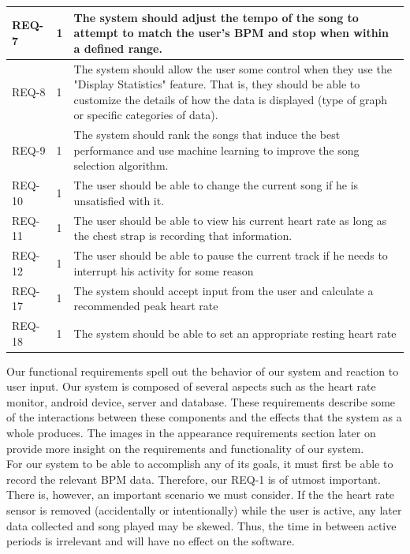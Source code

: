 \documentclass[letterpaper,english, 12pt]{scrreprt}
\begin{document}
\begin{center}
	\begin{tabular}{|C{2cm}|C{2cm}|C{8cm}|}
		\hline
			REQ-7 & 1 & The system should adjust the tempo of the song to attempt to match the user's BPM and stop when within a defined range. \\
		\hline
			REQ-8 & 1 & The system should allow the user some control when they use the "Display Statistics" feature. That is, they should be able to customize the details of how the data is displayed (type of graph or specific categories of data).\\
		\hline
			REQ-9 & 1 & The system should rank the songs that induce the best performance and use machine learning to improve the song selection algorithm. \\
		\hline
                        REQ-10 & 1 & The user should be able to change the current song if he is unsatisfied with it. \\
                \hline
                        REQ-11 & 1 & The user should be able to view his current heart rate as long as the chest strap is recording that information. \\
		\hline
			REQ-12 & 1 & The user should be able to pause the current track if he needs to interrupt his activity for some reason \\
		\hline
			REQ-17 & 1 & The system should accept input from the user and calculate a recommended peak heart rate \\
		\hline
			REQ-18 & 1 & The system should be able to set an appropriate resting heart rate \\
	\end{tabular}
\end{center}

Our functional requirements spell out the behavior of our system and reaction to
user input. Our system is composed of several aspects such as the heart rate
monitor, android device, server and database. These requirements
describe some of the interactions between these components and the effects that
the system as a whole produces. The images in the appearance requirements section
later on provide more insight on the requirements and functionality of our system. \\

For our system to be able to accomplish any of its goals, it must first be able to record the relevant BPM data. Therefore, our REQ-1 is of utmost important. There is, however, an important scenario we must consider. If the the heart rate sensor is removed (accidentally or intentionally) while the user is active, any later data collected and song played may be skewed. Thus, the time in between active periods is irrelevant and will have no effect on the software.\\
\end{document}
